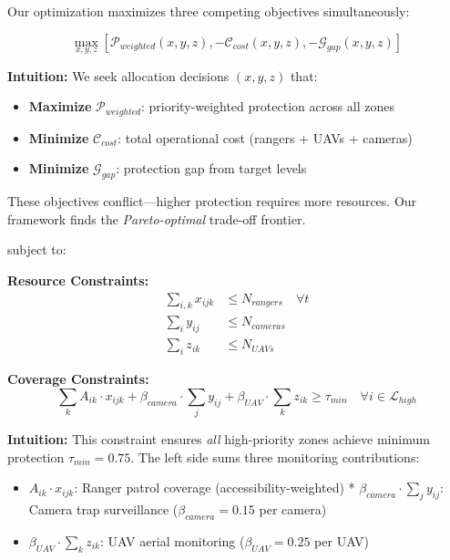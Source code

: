 Our optimization maximizes three competing objectives simultaneously:

\begin{equation}
\max_{x, y, z} \left[ \mathcal{P}_{weighted}(x, y, z), -\mathcal{C}_{cost}(x, y, z), -\mathcal{G}_{gap}(x, y, z) \right]
\label{eq:multi_objective}
\end{equation}

\noindent \textbf{Intuition:} We seek allocation decisions $(x, y, z)$ that:
\begin{itemize}
    \item \textbf{Maximize} $\mathcal{P}_{weighted}$: priority-weighted protection across all zones
    \item \textbf{Minimize} $\mathcal{C}_{cost}$: total operational cost (rangers + UAVs + cameras)
    \item \textbf{Minimize} $\mathcal{G}_{gap}$: protection gap from target levels
\end{itemize}

These objectives conflict—higher protection requires more resources. Our framework finds the \textit{Pareto-optimal} trade-off frontier.

subject to:

\noindent \textbf{Resource Constraints:}
\begin{align}
\sum_{i,k} x_{ijk} &\leq N_{rangers} \quad \forall t \label{eq:ranger_limit} \\
\sum_{i} y_{ij} &\leq N_{cameras} \label{eq:camera_limit} \\
\sum_{i} z_{ik} &\leq N_{UAVs} \label{eq:uav_limit}
\end{align}

\noindent \textbf{Coverage Constraints:}
\begin{equation}
\sum_{k} A_{ik} \cdot x_{ijk} + \beta_{camera} \cdot \sum_{j} y_{ij} + \beta_{UAV} \cdot \sum_{k} z_{ik} \geq \tau_{min} \quad \forall i \in \mathcal{L}_{high}
\label{eq:coverage_requirement}
\end{equation}

\noindent \textbf{Intuition:} This constraint ensures \textit{all} high-priority zones achieve minimum protection $\tau_{min} = 0.75$. The left side sums three monitoring contributions:
\begin{itemize}
    \item $A_{ik} \cdot x_{ijk}$: Ranger patrol coverage (accessibility-weighted)
    * $\beta_{camera} \cdot \sum_{j} y_{ij}$: Camera trap surveillance ($\beta_{camera} = 0.15$ per camera)
    \item $\beta_{UAV} \cdot \sum_{k} z_{ik}$: UAV aerial monitoring ($\beta_{UAV} = 0.25$ per UAV)
\end{itemize}

